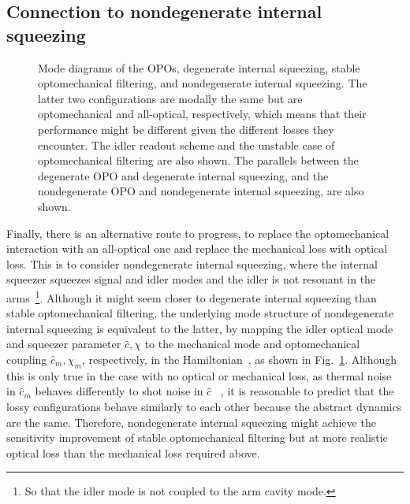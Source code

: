 \subsection{Connection to nondegenerate internal squeezing}
\label{sec:modal_equivalence}

\begin{figure}
	\centering
	\caption{ Mode diagrams of the OPOs, degenerate internal squeezing, stable optomechanical filtering, and nondegenerate internal squeezing. The latter two configurations are modally the same but are optomechanical and all-optical, respectively, which means that their performance might be different given the different losses they encounter. The idler readout scheme and the unstable case of optomechanical filtering are also shown. The parallels between the degenerate OPO and degenerate internal squeezing, and the nondegenerate OPO and nondegenerate internal squeezing, are also shown.}
	\label{fig:mode_diagram}
\end{figure}

Finally, there is an alternative route to progress, to replace the optomechanical interaction with an all-optical one and replace the mechanical loss with optical loss. This is to consider nondegenerate internal squeezing, where the internal squeezer squeezes signal and idler modes and the idler is not resonant in the arms~\footnote{So that the idler mode is not coupled to the arm cavity mode.}. 
Although it might seem closer to degenerate internal squeezing than stable optomechanical filtering, the underlying mode structure of nondegenerate internal squeezing is equivalent to the latter, by mapping the idler optical mode and squeezer parameter $\hat c, \chi$ to the mechanical mode and optomechanical coupling $\hat{c}_m, \chi_m$, respectively, in the Hamiltonian~\cite{}, as shown in Fig.~\ref{fig:mode_diagram}. Although this is only true in the case with no optical or mechanical loss, as thermal noise in $\hat{c}_m$ behaves differently to shot noise in $\hat c$~\cite{} , it is reasonable to predict that the lossy configurations behave similarly to each other because the abstract dynamics are the same. Therefore, nondegenerate internal squeezing might achieve the sensitivity improvement of stable optomechanical filtering but at more realistic optical loss than the mechanical loss required above.

